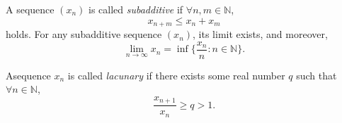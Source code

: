 \documentclass[12pt]{article}
\begin{document}
\begin{lemma}
   A sequence $(x_n)$ is called \emph{subadditive} if $\forall n, m \in \mathbb{N}$, \[
   x_{n+m} \leq x_n + x_m 
   \]
   holds. For any subadditive sequence $(x_n)$, its limit exists, and moreover, \[
    \lim_{n\to\infty} x_n = \inf \{\frac{x_n}{n} : n \in \mathbb{N}\}.
   \]
\end{lemma}

\begin{definition}
  Asequence $x_n$ is called \emph{lacunary} if there exists some real number $q$ such that $\forall n \in \mathbb{N}$, \[
    \frac{x_{n+1}}{x_n} \geq q > 1.
  \]
\end{definition}


\end{document}
